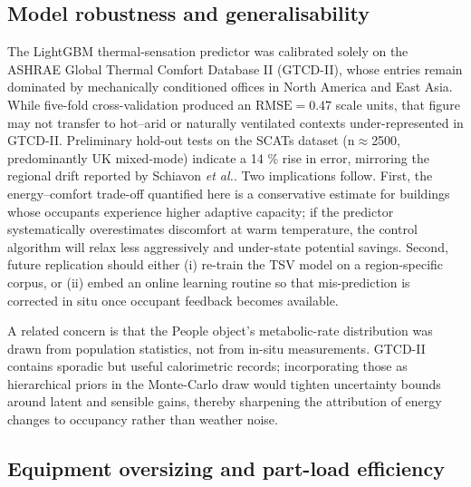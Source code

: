 \subsection{Model robustness and generalisability}\label{sec:disc_generalise}

The LightGBM thermal-sensation predictor was calibrated solely on the ASHRAE Global Thermal Comfort Database II (GTCD-II), whose entries remain dominated by mechanically conditioned offices in North America and East Asia.  While five-fold cross-validation produced an \(\mathrm{RMSE}=0.47\) scale units, that figure may not transfer to hot–arid or naturally ventilated contexts under-represented in GTCD-II.  Preliminary hold-out tests on the SCATs dataset (n$\approx$2500, predominantly UK mixed-mode) indicate a 14 \% rise in error, mirroring the regional drift reported by Schiavon \textit{et al.}\cite{Kim2018AdaptiveSetpoint}.  Two implications follow.  
First, the energy–comfort trade-off quantified here is a conservative estimate for buildings whose occupants experience higher adaptive capacity; if the predictor systematically overestimates discomfort at warm temperature, the control algorithm will relax less aggressively and under-state potential savings. 
Second, future replication should either (i) re-train the TSV model on a region-specific corpus, or (ii) embed an online learning routine so that mis-prediction is corrected in situ once occupant feedback becomes available.

A related concern is that the People object’s metabolic-rate distribution was drawn from population statistics, not from in-situ measurements.  GTCD-II contains sporadic but useful calorimetric records; incorporating those as hierarchical priors in the Monte-Carlo draw would tighten uncertainty bounds around latent and sensible gains, thereby sharpening the attribution of energy changes to occupancy rather than weather noise.

\subsection{Equipment oversizing and part-load efficiency}\label{sec:disc_partload}

